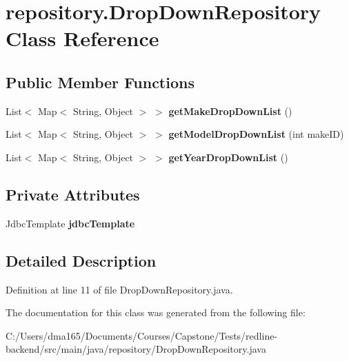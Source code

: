 \hypertarget{classrepository_1_1_drop_down_repository}{}\section{repository.\+Drop\+Down\+Repository Class Reference}
\label{classrepository_1_1_drop_down_repository}
\subsection*{Public Member Functions}
\begin{DoxyCompactItemize}
\item 
\mbox{\label{classrepository_1_1_drop_down_repository_ad20d1719459f2504fb6fc270ddc0058e}} 
List$<$ Map$<$ String, Object $>$ $>$ {\bfseries get\+Make\+Drop\+Down\+List} ()
\item 
\mbox{\label{classrepository_1_1_drop_down_repository_aa54b7e45a8d7ba73ab22a98f38246005}} 
List$<$ Map$<$ String, Object $>$ $>$ {\bfseries get\+Model\+Drop\+Down\+List} (int make\+ID)
\item 
\mbox{\label{classrepository_1_1_drop_down_repository_aee30288cfc5d7dd729da52dcbfd0f443}} 
List$<$ Map$<$ String, Object $>$ $>$ {\bfseries get\+Year\+Drop\+Down\+List} ()
\end{DoxyCompactItemize}
\subsection*{Private Attributes}
\begin{DoxyCompactItemize}
\item 
\mbox{\label{classrepository_1_1_drop_down_repository_a3c324d4a56762508a1f8dcd9688a2cea}} 
Jdbc\+Template {\bfseries jdbc\+Template}
\end{DoxyCompactItemize}


\subsection{Detailed Description}


Definition at line 11 of file Drop\+Down\+Repository.\+java.



The documentation for this class was generated from the following file\+:\begin{DoxyCompactItemize}
\item 
C\+:/\+Users/dma165/\+Documents/\+Courses/\+Capstone/\+Tests/redline-\/backend/src/main/java/repository/Drop\+Down\+Repository.\+java\end{DoxyCompactItemize}
